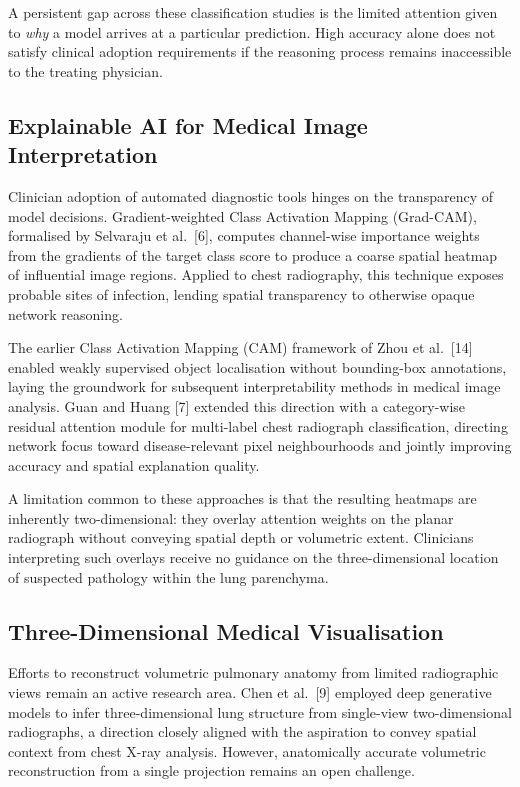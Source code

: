 \documentclass[conference]{IEEEtran}
\begin{document}
A persistent gap across these classification studies is the limited attention given to \emph{why} a model arrives at a particular prediction. High accuracy alone does not satisfy clinical adoption requirements if the reasoning process remains inaccessible to the treating physician.

\subsection{Explainable AI for Medical Image Interpretation}

Clinician adoption of automated diagnostic tools hinges on the transparency of model decisions. Gradient-weighted Class Activation Mapping (Grad-CAM), formalised by Selvaraju et al.\ [6], computes channel-wise importance weights from the gradients of the target class score to produce a coarse spatial heatmap of influential image regions. Applied to chest radiography, this technique exposes probable sites of infection, lending spatial transparency to otherwise opaque network reasoning.

The earlier Class Activation Mapping (CAM) framework of Zhou et al.\ [14] enabled weakly supervised object localisation without bounding-box annotations, laying the groundwork for subsequent interpretability methods in medical image analysis. Guan and Huang [7] extended this direction with a category-wise residual attention module for multi-label chest radiograph classification, directing network focus toward disease-relevant pixel neighbourhoods and jointly improving accuracy and spatial explanation quality.

A limitation common to these approaches is that the resulting heatmaps are inherently two-dimensional: they overlay attention weights on the planar radiograph without conveying spatial depth or volumetric extent. Clinicians interpreting such overlays receive no guidance on the three-dimensional location of suspected pathology within the lung parenchyma.

\subsection{Three-Dimensional Medical Visualisation}

Efforts to reconstruct volumetric pulmonary anatomy from limited radiographic views remain an active research area. Chen et al.\ [9] employed deep generative models to infer three-dimensional lung structure from single-view two-dimensional radiographs, a direction closely aligned with the aspiration to convey spatial context from chest X-ray analysis. However, anatomically accurate volumetric reconstruction from a single projection remains an open challenge.
\end{document}
